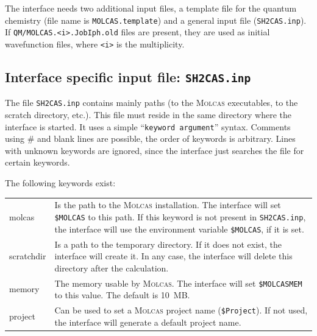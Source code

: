 \documentclass[a4paper,11pt,DIV=15,openany,twoside=false]{scrbook}
\newcommand{\sharc}{\textsc{Sharc}}
\newcommand{\ttt}[1]{\texttt{#1}}
\begin{document}

The interface needs two additional input files, a template file for the quantum chemistry (file name is \ttt{MOLCAS.template}) and a general input file (\ttt{SH2CAS.inp}). If \ttt{QM/MOLCAS.<i>.JobIph.old} files are present, they are used as initial wavefunction files, where \ttt{<i>} is the multiplicity. %

\subsection{Interface specific input file: \ttt{SH2CAS.inp}}

The file \ttt{SH2CAS.inp} contains mainly paths (to the \textsc{Molcas} executables, to the scratch directory, etc.). This file must reside in the same directory where the interface is started. It uses a simple ``\ttt{keyword argument}'' syntax. Comments using \# and blank lines are possible, the order of keywords is arbitrary. Lines with unknown keywords are ignored, since the interface just searches the file for certain keywords.

The following keywords exist:

\begin{tabular}{lp{12cm}}
molcas          &Is the path to the \textsc{Molcas} installation. The interface will set \ttt{\$MOLCAS} to this path. If this keyword is not present in \ttt{SH2CAS.inp}, the interface will use the environment variable \ttt{\$MOLCAS}, if it is set.\\
scratchdir      &Is a path to the temporary directory. If it does not exist, the interface will create it. In any case, the interface will delete this directory after the calculation.\\
memory          &The memory usable by \textsc{Molcas}. The interface will set \ttt{\$MOLCASMEM} to this value. The default is 10~MB.\\
project         &Can be used to set a \textsc{Molcas} project name (\ttt{\$Project}). If not used, the interface will generate a default project name.
\end{tabular}
\end{document}
